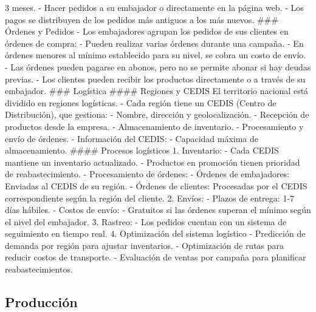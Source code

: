 \documentclass[
  letterpaper,
  DIV=11,
  numbers=noendperiod]{scrreprt}
\begin{document}
3 meses. - Hacer pedidos a su embajador o directamente en la página web.
- Los pagos se distribuyen de los pedidos más antiguos a los más nuevos.
\#\#\# Órdenes y Pedidos - Los embajadores agrupan los pedidos de sus
clientes en órdenes de compra: - Pueden realizar varias órdenes durante
una campaña. - En órdenes menores al mínimo establecido para su nivel,
se cobra un costo de envío. - Las órdenes pueden pagarse en abonos, pero
no se permite abonar si hay deudas previas. - Los clientes pueden
recibir los productos directamente o a través de su embajador. \#\#\#
Logística \#\#\#\# Regiones y CEDIS El territorio nacional está dividido
en regiones logísticas. - Cada región tiene un CEDIS (Centro de
Distribución), que gestiona: - Nombre, dirección y geolocalización. -
Recepción de productos desde la empresa. - Almacenamiento de inventario.
- Procesamiento y envío de órdenes. - Información del CEDIS: - Capacidad
máxima de almacenamiento. \#\#\#\# Procesos logísticos 1. Inventario: -
Cada CEDIS mantiene un inventario actualizado. - Productos en promoción
tienen prioridad de reabastecimiento. - Procesamiento de órdenes: -
Órdenes de embajadores: Enviadas al CEDIS de su región. - Órdenes de
clientes: Procesadas por el CEDIS correspondiente según la región del
cliente. 2. Envíos: - Plazos de entrega: 1-7 días hábiles. - Costos de
envío: - Gratuitos si las órdenes superan el mínimo según el nivel del
embajador. 3. Rastreo: - Los pedidos cuentan con un sistema de
seguimiento en tiempo real. 4. Optimización del sistema logístico -
Predicción de demanda por región para ajustar inventarios. -
Optimización de rutas para reducir costos de transporte. - Evaluación de
ventas por campaña para planificar reabastecimientos.

\subsection{Producción}\label{producciuxf3n}
\end{document}
